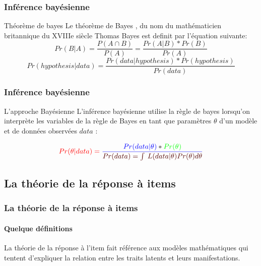 \documentclass[aspectratio=169,professionalfonts, 12pt]{beamer}
\begin{document}
\begin{frame}
  \frametitle{Inférence bayésienne}
  \justifying 
  \begin{minipage}{\textwidth}
  \begin{block}{Théorème de bayes}
    Le théorème de Bayes , du nom du mathématicien britannique du XVIIIe siècle Thomas Bayes est definit par l'équation suivante:   
    \begin{equation}
      Pr(B|A) = \frac{P(A\cap B)}{P(A)} = \frac{Pr(A|B)*Pr(B)}{Pr(A)}
      \label{theoreme_bayes}
    \end{equation} 
    \begin{equation}
      Pr(hypothesis|data) = \frac{Pr(data|hypothesis)*Pr(hypothesis)}{Pr(data)}
      \label{theoreme_bayes2}
    \end{equation}
  \end{block}
  \end{minipage} 
\end{frame}


\begin{frame}
  \frametitle{Inférence bayésienne}
  \justifying 
  \begin{minipage}{\textwidth}
  \begin{block}{L’approche Bayésienne}
    L'inférence bayésienne utilise la règle de bayes lorsqu’on interprète les variables de la règle de Bayes en tant que paramètres \(\displaystyle \theta \) d'un modèle et de données observées \(\displaystyle data \) : 
  \end{block}
  \end{minipage}
  \begin{minipage}{\textwidth}
    \centering
    \begin{equation}
      \color{red} Pr(\theta|data) = \color{blue} \frac{Pr(data|\theta)\color{black} * \color{green}Pr(\theta)}{ \color{blueforest} Pr(data) =  \int_{}^{}  \,L(data|\theta)Pr(\theta)d\theta }
      \label{theoreme_bayes3}
    \end{equation}
  \end{minipage}
\end{frame}

\subsection{La théorie de la réponse à items}

\begin{frame}
  \frametitle{La théorie de la réponse à items}
  \framesubtitle{Quelque définitions}
  \justifying 
  \begin{minipage}{\textwidth}
  \begin{block}{}
    La théorie de la réponse à l'item fait référence aux modèles mathématiques qui tentent d'expliquer la relation entre les traits latents et leurs manifestations.
  \end{block}


  \end{minipage} 
\end{frame}
\end{document}
